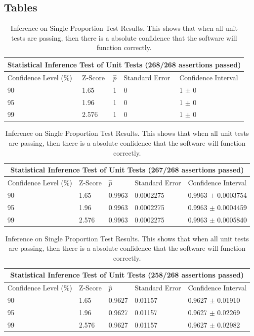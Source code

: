 \documentclass[12pt]{article}
\begin{document}
\subsection{Tables}
\begin{table}[H]
    \centering
    \begin{tabular}{|p{4cm} p{2cm} p{2cm} p{3cm} p{4cm}|}
        \hline
        \multicolumn{5}{|c|}{Statistical Inference Test of Unit Tests (268/268 assertions passed)} \\
        \hline
        Confidence Level (\%) & Z-Score & $\hat{p}$ & Standard Error & Confidence Interval \\
        \hline
        90 & 1.65  & 1 & 0 & 1 $\pm$ 0 \\
        95 & 1.96  & 1 & 0 & 1 $\pm$ 0 \\
        99 & 2.576 & 1 & 0 & 1 $\pm$ 0 \\
        \hline
    \end{tabular}
    \begin{tabular}{|p{4cm} p{2cm} p{2cm} p{3cm} p{4cm}|}
        \hline
        \multicolumn{5}{|c|}{Statistical Inference Test of Unit Tests (267/268 assertions passed)} \\
        \hline
        Confidence Level (\%) & Z-Score & $\hat{p}$ & Standard Error & Confidence Interval \\
        \hline
        90 & 1.65  & 0.9963 & 0.0002275 & 0.9963 $\pm$ 0.0003754 \\
        95 & 1.96  & 0.9963 & 0.0002275 & 0.9963 $\pm$ 0.0004459 \\
        99 & 2.576 & 0.9963 & 0.0002275 & 0.9963 $\pm$ 0.0005840 \\
        \hline
    \end{tabular}
    \begin{tabular}{|p{4cm} p{2cm} p{2cm} p{3cm} p{4cm}|}
        \hline
        \multicolumn{5}{|c|}{Statistical Inference Test of Unit Tests (258/268 assertions passed)} \\
        \hline
        Confidence Level (\%) & Z-Score & $\hat{p}$ & Standard Error & Confidence Interval \\
        \hline
        90 & 1.65  & 0.9627 & 0.01157 & 0.9627 $\pm$ 0.01910 \\
        95 & 1.96  & 0.9627 & 0.01157 & 0.9627 $\pm$ 0.02269 \\
        99 & 2.576 & 0.9627 & 0.01157 & 0.9627 $\pm$ 0.02982 \\
        \hline
    \end{tabular}
    \caption{Inference on Single Proportion Test Results. This shows that when all unit tests are passing, then there is a absolute confidence that the software will function correctly.}
    \label{tab:inference}
\end{table}
\end{document}
